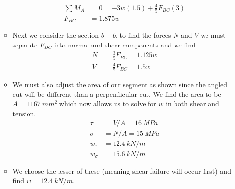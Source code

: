 \documentclass[12pt, oneside]{article}
\begin{document}
\begin{enumerate}
\begin{itemize}
\begin{align*}
				\sum M_A &= 0 = -3w(1.5) + \frac{4}{5} F_{BC}(3)\\
				F_{BC} &= 1.875w
			\end{align*}
		\item Next we consider the section $b-b$, to find the forces $N$ and $V$ we must separate $F_{BC}$ into normal and shear components and we find
			\begin{align*}
				N &= \frac{3}{5} F_{BC} = 1.125w\\
				V &= \frac{4}{5} F_{BC} = 1.5w
			\end{align*}
		\item We must also adjust the area of our segment as shown since the angled cut will be different than a perpendicular cut. We find the area to be $A = \SI{1167}{mm^2}$ which now allows us to solve for $w$ in both shear and tension.
			\begin{align*}
				\tau &= V/A = \SI{16}{MPa}\\
				\sigma &= N/A = \SI{15}{MPa}\\
				w_\tau &= \SI{12.4}{kN/m}\\
				w_\sigma &= \SI{15.6}{kN/m}
			\end{align*}
		\item We choose the lesser of these (meaning shear failure will occur first) and find $w=\SI{12.4}{kN/m}$.
		\end{itemize}
	

\end{enumerate}
\end{document}
